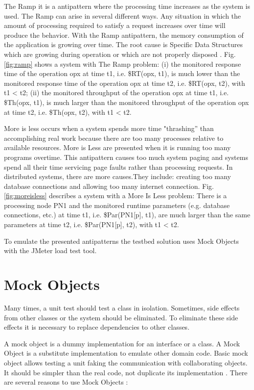 \documentclass[times]{stvrauth}
\begin{document}
The Ramp it is a antipattern where the processing time increases as the system is used. The Ramp can arise in several different ways. Any situation in which the amount of processing required to satisfy a request increases over time will produce the behavior. With the Ramp antipattern, the memory consumption of the application is growing over time. The root cause is Specific Data Structures which are growing during operation or which are not properly disposed \cite{Wert2014} \cite{Smith2003}. Fig. \ref{fig:ramp} shows a system  with The Ramp problem:  (i) the monitored response time of the operation opx at time t1, i.e. \$RT(opx, t1), is much lower than the monitored response time of the operation opx at time t2, i.e. \$RT(opx, t2), with t1 < t2; (ii) the monitored throughput of the operation opx at time t1, i.e. \$Th(opx, t1), is much larger than the monitored throughput of the operation opx at time t2, i.e. \$Th(opx, t2), with t1 < t2. 

More is less occurs when a system spends more time "thrashing” than accomplishing real work because there are too many processes relative to available resources. More is Less are presented when it is running too many programs overtime. This antipattern causes too much system paging and systems spend all their time servicing page faults rather than processing requests. In distributed systems, there are more causes.They include: creating too many database connections and  allowing too many internet connection. Fig. \ref{fig:moreisless} describes a system  with a More Is Less problem: There is a processing node PN1 and the monitored runtime parameters (e.g. database connections, etc.) at time t1, i.e. \$Par(PN1[p], t1), are much larger than the same parameters at time t2, i.e. \$Par(PN1[p], t2), with t1 < t2. 


To emulate the presented antipatterns the testbed solution uses Mock Objects with the JMeter load test tool.

\FloatBarrier
\section{Mock Objects}

Many times, a unit test should test a class in isolation. Sometimes, side effects from other classes or the system should be eliminated. To eliminate these side effects it is necessary  to replace dependencies to other classes. 

A mock object is a dummy implementation for an interface or a class. A Mock Object is a substitute implementation to emulate other domain code. Basic mock object allows
testing a unit faking the communication with collaborating objects. It
should be simpler than the real code, not duplicate its implementation \cite{Mackinnon2001} \cite{Brown2003}. There are several reasons to use Mock Objects \cite{Hunt2002}:
\end{document}
